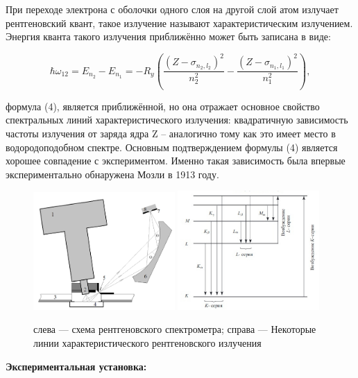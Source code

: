 \documentclass[a4paper, 12pt]{article}%
\begin{document}
	
	При переходе электрона с оболочки одного слоя на другой слой атом
	излучает рентгеновский квант, такое излучение называют характеристическим излучением. Энергия кванта такого излучения приближённо
	может быть записана в виде:
	
	\begin{equation}
		\hbar \omega_{12}=E_{n_2}-E_{n_1}=-R_y\left(\frac{\left(Z-\sigma_{n_2, l_2}\right)^2}{n_2^2}-\frac{\left(Z-\sigma_{n_1, l_1}\right)^2}{n_1^2}\right),
	\end{equation}

	формула (4), является приближённой,
	но она отражает основное свойство спектральных линий характеристического излучения: квадратичную зависимость частоты излучения от заряда ядра Z – аналогично тому как это имеет место в водородоподобном спектре. Основным подтверждением формулы (4) является
	хорошее совпадение с экспериментом. Именно такая зависимость
	была впервые экспериментально обнаружена Мозли в 1913 году.\\
	
	
	
		\begin{figure}[H]
		\centering
		\includegraphics[width=0.48\textwidth]{ust}
		\hfill
		\includegraphics[width=0.48\textwidth]{spectr}
		\caption{слева --- схема рентгеновского спектрометра; справа --- Некоторые линии характеристического рентгеновского излучения}
		\label{pic:scheme}
	\end{figure}
	\textbf{Экспериментальная установка: }\\
	
\end{document}
